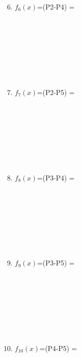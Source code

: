 \documentclass[12pt]{article}
\begin{document}
\begin{minipage}[t]{0.6\textwidth}
    \begin{enumerate}[\#1]
        \setcounter{enumi}{5} %
        \item $f_6(x)$=(P2-P4) =
        \\\\\\\\\\\\\\\\
        \item $f_7(x)$=(P2-P5) =
        \\\\\\\\\\\\\\\\
        \item $f_8(x)$=(P3-P4) =
        \\\\\\\\\\\\\\\\
        \item $f_9(x)$=(P3-P5) =
        \\\\\\\\\\\\\\\\
        \item $f_{10}(x)$=(P4-P5) =
        

    \end{enumerate}
\end{minipage}
\end{document}
